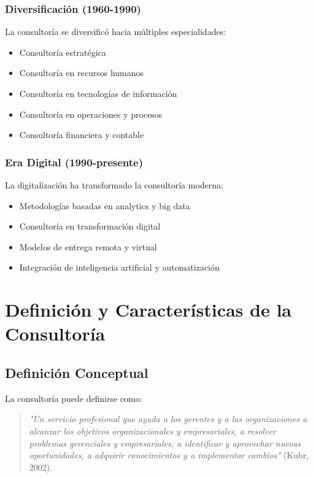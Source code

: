 \documentclass[12pt,letterpaper,oneside]{book}
\begin{document}
\subsubsection{Diversificación (1960-1990)}

La consultoría se diversificó hacia múltiples especialidades:

\begin{itemize}
\item Consultoría estratégica
\item Consultoría en recursos humanos
\item Consultoría en tecnologías de información
\item Consultoría en operaciones y procesos
\item Consultoría financiera y contable
\end{itemize}

\subsubsection{Era Digital (1990-presente)}

La digitalización ha transformado la consultoría moderna:

\begin{itemize}
\item Metodologías basadas en analytics y big data
\item Consultoría en transformación digital
\item Modelos de entrega remota y virtual
\item Integración de inteligencia artificial y automatización
\end{itemize}

\section{Definición y Características de la Consultoría}

\subsection{Definición Conceptual}

La consultoría puede definirse como:

\begin{quote}
\textit{"Un servicio profesional que ayuda a los gerentes y a las organizaciones a alcanzar los objetivos organizacionales y empresariales, a resolver problemas gerenciales y empresariales, a identificar y aprovechar nuevas oportunidades, a adquirir conocimientos y a implementar cambios"} (Kubr, 2002).
\end{quote}
\end{document}
